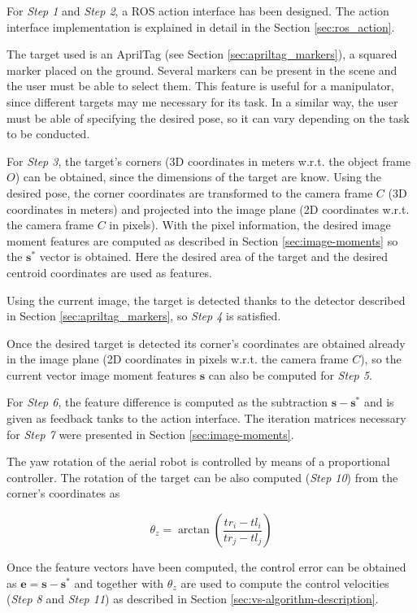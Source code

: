 For \emph{Step 1} and \emph{Step 2}, a ROS action interface has been designed. The action interface implementation is explained in detail in the Section \ref{sec:ros_action}.	

The target used is an AprilTag (see Section \ref{sec:apriltag_markers}), a squared marker placed on the ground. Several markers can be present in the scene and the user must be able to select them. This feature is useful for a manipulator, since different targets may me necessary for its task. In a similar way, the user must be able of specifying the desired pose, so it can vary depending on the task to be conducted.

For \emph{Step 3}, the target's corners (3D coordinates in meters w.r.t. the object frame $O$) can be obtained, since the dimensions of the target are know. Using the desired pose, the corner coordinates are transformed to the camera frame $C$ (3D coordinates in meters) and projected into the image plane (2D coordinates w.r.t. the camera frame $C$ in pixels). With the pixel information, the desired image moment features are computed as described in Section \ref{sec:image-moments} so the $\bm{s}^\ast$ vector is obtained. Here the desired area of the target and the desired centroid coordinates are used as features.
 
Using the current image, the target is detected thanks to the detector described in Section \ref{sec:apriltag_markers}, so \emph{Step 4} is satisfied.
 
Once the desired target is detected its corner's coordinates are obtained already in the image plane (2D coordinates in pixels w.r.t. the camera frame $C$), so the current vector image moment features $\bm{s}$ can also be computed for \emph{Step 5}.

For \emph{Step 6}, the feature difference is computed as the subtraction $\bm{s} - \bm{s}^\ast$ and is given as feedback tanks to the action interface. The iteration matrices necessary for \emph{Step 7} were presented in Section \ref{sec:image-moments}.

The yaw rotation of the aerial robot is controlled by means of a proportional controller. The rotation of the target can be also computed (\emph{Step 10}) from the corner's coordinates as

\begin{equation}
 \theta_z = \arctan \left( \frac{tr_i - tl_i}{tr_j - tl_j} \right) 
\end{equation}
 
 Once the feature vectors have been computed, the control error can be obtained as $\bm{e} = \bm{s} - \bm{s}^\ast$ and together with $\theta_z$ are used to compute the control velocities (\emph{Step 8} and \emph{Step 11}) as described in Section \ref{sec:vs-algorithm-description}.
 
